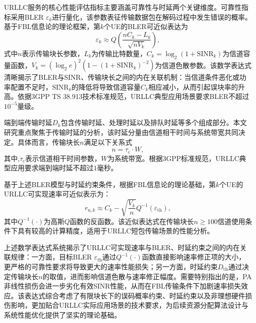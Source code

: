 URLLC服务的核心性能评估指标主要涵盖可靠性与时延两个关键维度。可靠性指标采用BLER $\varepsilon_k$进行量化，该参数表征传输数据包在解码过程中发生错误的概率。基于FBL信息论的理论框架，第$k$个UE的BLER可近似表达为
\begin{equation}
\varepsilon_k \approx Q\left(\frac{nC_k - L_k}{\sqrt{nV_k}}\right),
\end{equation}
式中$n$表示传输块长参数，$L_k$为传输比特数量，$C_k = \log_2(1 + \text{SINR}_k)$为信道容量函数，$V_k = (\log_2 e)^2(1 - (1 + \text{SINR}_k)^{-2})$为信道色散参数。该数学表达式清晰揭示了BLER与SINR、传输块长之间的内在关联机制：当信道条件恶化或功率配置不足时，$\text{SINR}_k$的降低将导致信道容量$C_k$相应减小，从而引起误块率的升高。依据3GPP TS 38.913技术标准规范，URLLC典型应用场景要求BLER不超过$10^{-5}$量级。

端到端传输时延$D_k$包含传输时延、处理时延以及排队时延等多个组成部分。本文研究重点聚焦于传输时延的分析，该时延分量由信道相干时间与系统带宽共同决定。具体而言，传输块长$n$满足以下关系式
\begin{equation}
n = \tau_{\text{c}} \cdot W,
\end{equation}
其中,$\tau_{\text{c}}$表示信道相干时间参数，$W$为系统带宽。根据3GPP标准规范，URLLC典型应用要求端到端时延不超过$1$毫秒。

基于上述BLER模型与时延约束条件，根据FBL信息论的理论基础\cite{chaptertwo1}，第$k$个UE的URLLC可实现速率可近似表示为：
\begin{equation}
r_{\text{u},k} \approx C_k - \sqrt{\frac{V_k}{n}} Q^{-1}(\varepsilon_{\text{th}}),
\end{equation}
其中$Q^{-1}(\cdot)$为高斯$Q$函数的反函数。该近似表达式在传输块长$n \geq 100$信道使用条件下具有较高的计算精度，适用于URLLC短包传输场景的性能分析。

上述数学表达式系统揭示了URLLC可实现速率与BLER、时延约束之间的内在关联规律：一方面，目标BLER $\varepsilon_{\text{th}}$通过$Q^{-1}(\cdot)$函数直接影响速率修正项的大小，更严格的可靠性要求将导致更大的速率性能损失；另一方面，时延约束$D_{\text{th}}$通过决定传输块长$n$的取值，进而影响信道色散与速率修正幅度。需要特别指出的是，PA非线性损伤会进一步劣化有效SINR性能，从而在FBL传输条件下加剧速率损失效应。该表达式综合考虑了有限块长下的误码概率约束、时延约束以及非理想硬件损伤影响，更加贴合URLLC实际应用场景的技术要求，为后续资源分配算法设计与系统性能优化提供了坚实的理论基础。

